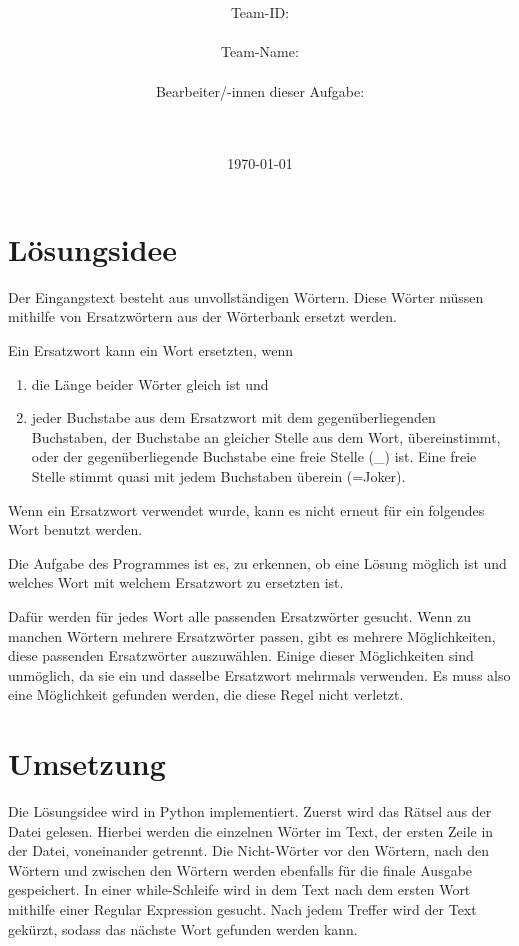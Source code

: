 \documentclass[a4paper,10pt,ngerman]{scrartcl}
\title{\textbf{\Huge\Aufgabe}}
\author{\LARGE Team-ID: \LARGE \TeamId \\\\
	    \LARGE Team-Name: \LARGE \TeamName \\\\
	    \LARGE Bearbeiter/-innen dieser Aufgabe: \\ 
	    \LARGE \Namen\\\\}
\date{\LARGE\today}
\begin{document}
\maketitle
\tableofcontents

\vspace{0.5cm}

\section{Lösungsidee}

Der Eingangstext besteht aus unvollständigen Wörtern.
Diese Wörter müssen mithilfe von Ersatzwörtern aus der Wörterbank ersetzt werden.

Ein Ersatzwort kann ein Wort ersetzten, wenn
\begin{enumerate}
    \item die Länge beider Wörter gleich ist und
    \item jeder Buchstabe aus dem Ersatzwort mit dem gegenüberliegenden Buchstaben, der Buchstabe an gleicher Stelle aus dem Wort, übereinstimmt, oder der gegenüberliegende Buchstabe eine freie Stelle (\glqq \_\grqq{}) ist.
    Eine freie Stelle stimmt quasi mit jedem Buchstaben überein (=Joker).
\end{enumerate}
Wenn ein Ersatzwort verwendet wurde, kann es nicht erneut für ein folgendes Wort benutzt werden.

Die Aufgabe des Programmes ist es, zu erkennen, ob eine Lösung möglich ist und welches Wort mit welchem Ersatzwort zu ersetzten ist.

Dafür werden für jedes Wort alle passenden Ersatzwörter gesucht.
Wenn zu manchen Wörtern mehrere Ersatzwörter passen, gibt es mehrere Möglichkeiten, diese passenden Ersatzwörter auszuwählen.
Einige dieser Möglichkeiten sind unmöglich, da sie ein und dasselbe Ersatzwort mehrmals verwenden.
Es muss also eine Möglichkeit gefunden werden, die diese Regel nicht verletzt.

\section{Umsetzung}

Die Lösungsidee wird in Python implementiert.
Zuerst wird das Rätsel aus der Datei gelesen.
Hierbei werden die einzelnen Wörter im Text, der ersten Zeile in der Datei, voneinander getrennt.
Die Nicht-Wörter vor den Wörtern, nach den Wörtern und zwischen den Wörtern werden ebenfalls für die finale Ausgabe gespeichert. 
In einer while-Schleife wird in dem Text nach dem ersten Wort mithilfe einer Regular Expression gesucht.
Nach jedem Treffer wird der Text gekürzt, sodass das nächste Wort gefunden werden kann.
\end{document}
